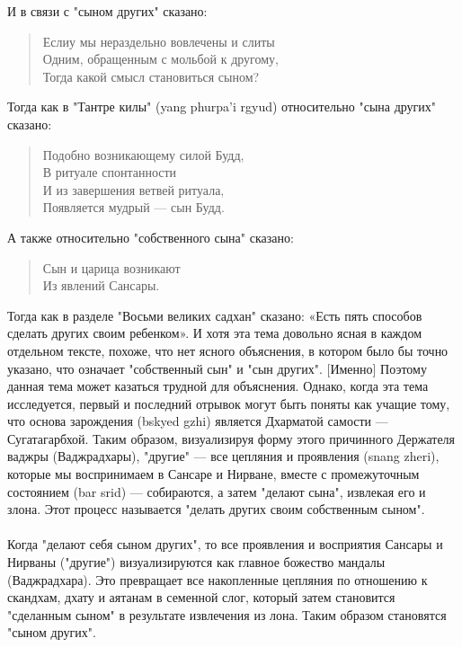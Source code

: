 \begin{siderules}
И в связи с "сыном других" сказано:
\begin{verse}
Еслиу мы нераздельно вовлечены и слиты\\
Одним, обращенным с мольбой к другому,\\
Тогда какой смысл становиться сыном?\\
\end{verse}

Тогда как в "Тантре килы" (yang phurpa'i rgyud) относительно "сына других" сказано:
\begin{verse}
Подобно возникающему силой Будд,\\
В ритуале спонтанности\\
И из завершения ветвей ритуала,\\
Появляется мудрый — сын Будд.\\
\end{verse}
А также относительно "собственного сына" сказано:
\begin{verse}
Сын и царица возникают\\
Из явлений Сансары.\\
\end{verse}
Тогда как в разделе "Восьми великих садхан" сказано:
«Есть пять способов сделать других своим ребенком».
И хотя эта тема довольно ясная в каждом отдельном тексте, похоже, что нет ясного
объяснения, в котором было бы точно указано, что означает "собственный сын" и "сын
других". [Именно] Поэтому данная тема может казаться трудной для объяснения.
Однако, когда эта тема исследуется, первый и последний отрывок могут быть поняты как учащие
тому, что основа зарождения (bskyed gzhi) является Дхарматой самости — Сугатагарбхой.
Таким образом, визуализируя форму этого причинного Держате\-ля ваджры (Ваджрадхары),
"другие" — все цепляния и прояв\-ления (snang zheri), которые мы воспринимаем в Сансаре и
Нирване, вместе с промежуточным состоянием (bar srid) — собираются, а затем
"делают сына", извлекая его и злона. Этот процесс называется "делать других
своим собственным сыном".\\
\\
Когда "делают себя сыном других", то все проявления и восприятия Сансары и Нирваны
("другие") визуализируют\-ся как главное божество мандалы (Ваджрадхара). Это превра\-щает
все накопленные цепляния по отношению к скандхам, дхату и аятанам в семенной слог,
который затем становится "сделанным сыном" в результате извлечения из лона. Таким
образом становятся "сыном других".\\

\end{siderules}
